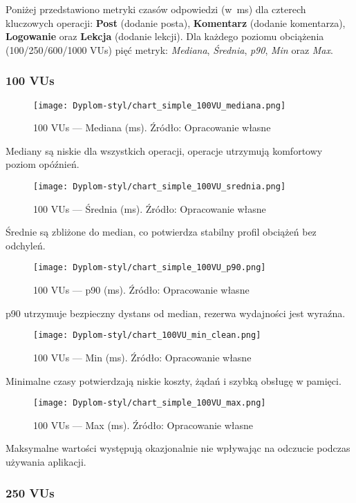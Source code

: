 Poniżej przedstawiono metryki czasów odpowiedzi (w~ms) dla czterech kluczowych operacji:
\textbf{Post} (dodanie posta), \textbf{Komentarz} (dodanie komentarza), \textbf{Logowanie} oraz  \textbf{Lekcja} (dodanie lekcji).
Dla każdego poziomu obciążenia (100/250/600/1000 VUs) pięć metryk: \emph{Mediana},
\emph{Średnia}, \emph{p90}, \emph{Min} oraz \emph{Max}.

\FloatBarrier
\clearpage

\subsubsection{100 VUs} \begin{figure}[H]\centering \texttt{[image: Dyplom-styl/chart\_simple\_100VU\_mediana.png]} \caption{100 VUs --- Mediana (ms). Źródło: Opracowanie własne}\label{fig:100-mediana} \end{figure} Mediany są niskie dla wszystkich operacji, operacje utrzymują komfortowy poziom opóźnień. \begin{figure}[H]\centering \texttt{[image: Dyplom-styl/chart\_simple\_100VU\_srednia.png]} \caption{100 VUs --- Średnia (ms). Źródło: Opracowanie własne}\label{fig:100-srednia} \end{figure} Średnie są zbliżone do median, co potwierdza stabilny profil obciążeń bez odchyleń. \begin{figure}[H]\centering \texttt{[image: Dyplom-styl/chart\_simple\_100VU\_p90.png]} \caption{100 VUs --- p90 (ms). Źródło: Opracowanie własne}\label{fig:100-p90} \end{figure} p90 utrzymuje bezpieczny dystans od median, rezerwa wydajności jest wyraźna. \begin{figure}[H]\centering \texttt{[image: Dyplom-styl/chart\_100VU\_min\_clean.png]} \caption{100 VUs --- Min (ms). Źródło: Opracowanie własne }\label{fig:100-min} \end{figure} Minimalne czasy potwierdzają niskie koszty, żądań i szybką obsługę w pamięci.
\begin{figure}[H]\centering \texttt{[image: Dyplom-styl/chart\_simple\_100VU\_max.png]} \caption{100 VUs --- Max (ms). Źródło: Opracowanie własne }\label{fig:100-min} \end{figure} Maksymalne wartości występują okazjonalnie nie wpływając na odczucie podczas używania aplikacji.
\subsubsection{250 VUs}

